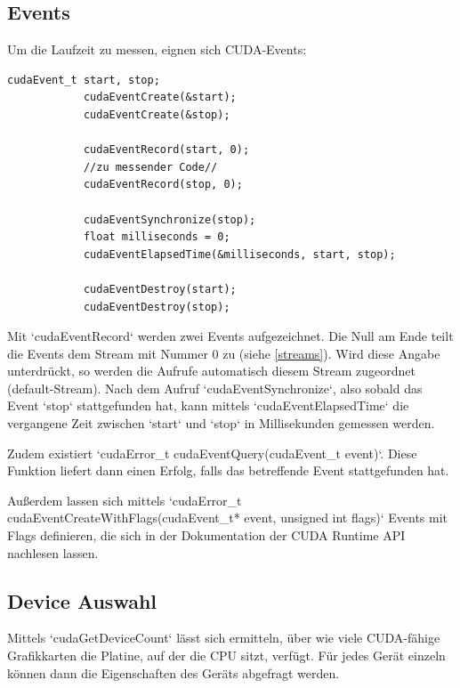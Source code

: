 		\subsection{Events}
        Um die Laufzeit zu messen, eignen sich CUDA-Events:		
		\begin{lstlisting}[caption=Events]
			cudaEvent_t start, stop;
			cudaEventCreate(&start);
			cudaEventCreate(&stop);

			cudaEventRecord(start, 0);
			//zu messender Code//
			cudaEventRecord(stop, 0);	
		
			cudaEventSynchronize(stop);
			float milliseconds = 0;
			cudaEventElapsedTime(&milliseconds, start, stop);
		
			cudaEventDestroy(start);
			cudaEventDestroy(stop);
		\end{lstlisting}

		Mit \li`cudaEventRecord` werden zwei Events aufgezeichnet. Die Null am Ende teilt die Events dem Stream mit Nummer 0 zu (siehe \ref{streams}). Wird diese Angabe unterdrückt, so werden die Aufrufe automatisch diesem \Gls{Stream} zugeordnet (default-\Gls{Stream}). Nach dem Aufruf \li`cudaEventSynchronize`, also sobald das Event \li`stop` stattgefunden hat, kann mittels \li`cudaEventElapsedTime` die vergangene Zeit zwischen \li`start` und \li`stop` in Millisekunden gemessen werden.
		
		Zudem existiert \li`cudaError_t cudaEventQuery(cudaEvent_t event)`. Diese Funktion liefert dann einen Erfolg, falls das betreffende Event stattgefunden hat.
		
		Außerdem lassen sich mittels \li`cudaError_t cudaEventCreateWithFlags(cudaEvent_t* event, unsigned int flags)` Events mit Flags definieren, die sich in der Dokumentation der CUDA Runtime \Gls{API} nachlesen lassen. \autocite{cudaRTAPI}
		
      
		\subsection{Device Auswahl}
		Mittels \li`cudaGetDeviceCount` lässt sich ermitteln, über wie viele CUDA-fähige Grafikkarten die Platine, auf der die CPU sitzt, verfügt. Für jedes Gerät einzeln können dann die Eigenschaften des Geräts abgefragt werden.
		
